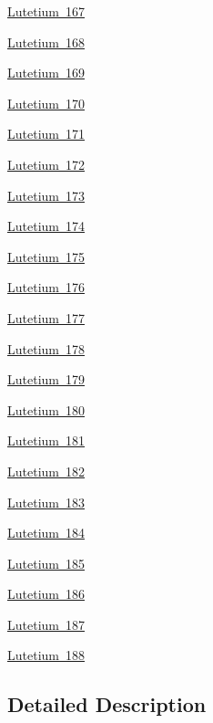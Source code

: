 \begin{DoxyCompactItemize}
\mbox{\hyperlink{group___isotope_const-_lutetium-_lu167}{Lutetium 167}}
\item 
\mbox{\hyperlink{group___isotope_const-_lutetium-_lu168}{Lutetium 168}}
\item 
\mbox{\hyperlink{group___isotope_const-_lutetium-_lu169}{Lutetium 169}}
\item 
\mbox{\hyperlink{group___isotope_const-_lutetium-_lu170}{Lutetium 170}}
\item 
\mbox{\hyperlink{group___isotope_const-_lutetium-_lu171}{Lutetium 171}}
\item 
\mbox{\hyperlink{group___isotope_const-_lutetium-_lu172}{Lutetium 172}}
\item 
\mbox{\hyperlink{group___isotope_const-_lutetium-_lu173}{Lutetium 173}}
\item 
\mbox{\hyperlink{group___isotope_const-_lutetium-_lu174}{Lutetium 174}}
\item 
\mbox{\hyperlink{group___isotope_const-_lutetium-_lu175}{Lutetium 175}}
\item 
\mbox{\hyperlink{group___isotope_const-_lutetium-_lu176}{Lutetium 176}}
\item 
\mbox{\hyperlink{group___isotope_const-_lutetium-_lu177}{Lutetium 177}}
\item 
\mbox{\hyperlink{group___isotope_const-_lutetium-_lu178}{Lutetium 178}}
\item 
\mbox{\hyperlink{group___isotope_const-_lutetium-_lu179}{Lutetium 179}}
\item 
\mbox{\hyperlink{group___isotope_const-_lutetium-_lu180}{Lutetium 180}}
\item 
\mbox{\hyperlink{group___isotope_const-_lutetium-_lu181}{Lutetium 181}}
\item 
\mbox{\hyperlink{group___isotope_const-_lutetium-_lu182}{Lutetium 182}}
\item 
\mbox{\hyperlink{group___isotope_const-_lutetium-_lu183}{Lutetium 183}}
\item 
\mbox{\hyperlink{group___isotope_const-_lutetium-_lu184}{Lutetium 184}}
\item 
\mbox{\hyperlink{group___isotope_const-_lutetium-_lu185}{Lutetium 185}}
\item 
\mbox{\hyperlink{group___isotope_const-_lutetium-_lu186}{Lutetium 186}}
\item 
\mbox{\hyperlink{group___isotope_const-_lutetium-_lu187}{Lutetium 187}}
\item 
\mbox{\hyperlink{group___isotope_const-_lutetium-_lu188}{Lutetium 188}}
\end{DoxyCompactItemize}


\subsection{Detailed Description}
